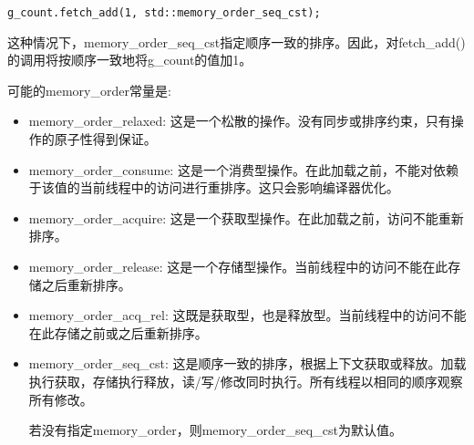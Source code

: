 \begin{lstlisting}[style=styleCXX]
g_count.fetch_add(1, std::memory_order_seq_cst);
\end{lstlisting}

这种情况下，memory\_order\_seq\_cst指定顺序一致的排序。因此，对fetch\_add()的调用将按顺序一致地将g\_count的值加1。

可能的memory\_order常量是:

\begin{itemize}
\item 
memory\_order\_relaxed: 这是一个松散的操作。没有同步或排序约束，只有操作的原子性得到保证。

\item 
memory\_order\_consume: 这是一个消费型操作。在此加载之前，不能对依赖于该值的当前线程中的访问进行重排序。这只会影响编译器优化。

\item 
memory\_order\_acquire: 这是一个获取型操作。在此加载之前，访问不能重新排序。

\item 
memory\_order\_release: 这是一个存储型操作。当前线程中的访问不能在此存储之后重新排序。

\item 
memory\_order\_acq\_rel: 这既是获取型，也是释放型。当前线程中的访问不能在此存储之前或之后重新排序。

\item 
memory\_order\_seq\_cst: 这是顺序一致的排序，根据上下文获取或释放。加载执行获取，存储执行释放，读/写/修改同时执行。所有线程以相同的顺序观察所有修改。

若没有指定memory\_order，则memory\_order\_seq\_cst为默认值。
\end{itemize}





